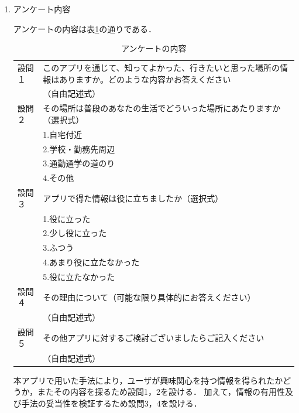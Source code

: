 \documentclass[a4paper]{jsarticle}
\begin{document}
\begin{enumerate}
\begin{enumerate}
\begin{enumerate}
  \item アンケート内容

  アンケートの内容は表\ref{tab:curation-questionnaire-content}の通りである．

  \begin{table}[H]
    \begin{center}
      \caption{アンケートの内容}
      \renewcommand\arraystretch{1.4}
      \begin{tabular}{|l|l|}
        \hline
        設問１ & \multicolumn{1}{p{10cm}|}{このアプリを通じて、知ってよかった、行きたいと思った場所の情報はありますか。どのような内容かお答えください} \\
        & （自由記述式） \\
        \hline
        設問２ & \multicolumn{1}{p{10cm}|}{その場所は普段のあなたの生活でどういった場所にあたりますか（選択式）} \\
        & 1.自宅付近 \\
        & 2.学校・勤務先周辺 \\
        & 3.通勤通学の道のり \\
        & 4.その他 \\
        \hline
        設問３ & \multicolumn{1}{p{10cm}|}{アプリで得た情報は役に立ちましたか（選択式）} \\
        & 1.役に立った \\
        & 2.少し役に立った \\
        & 3.ふつう \\
        & 4.あまり役に立たなかった \\
        & 5.役に立たなかった \\
        \hline
        設問４& \multicolumn{1}{p{10cm}|}{その理由について（可能な限り具体的にお答えください）} \\
        & （自由記述式） \\
        \hline
        設問５ & \multicolumn{1}{p{10cm}|}{その他アプリに対するご検討ございましたらご記入ください} \\
        & （自由記述式） \\
        \hline
      \end{tabular}
      \label{tab:curation-questionnaire-content}
    \end{center}
  \end{table}

  本アプリで用いた手法により，ユーザが興味関心を持つ情報を得られたかどうか，またその内容を探るため設問1，2を設ける．
  加えて，情報の有用性及び手法の妥当性を検証するため設問3，4を設ける．


\end{enumerate}
\end{enumerate}
\end{enumerate}
\end{document}
